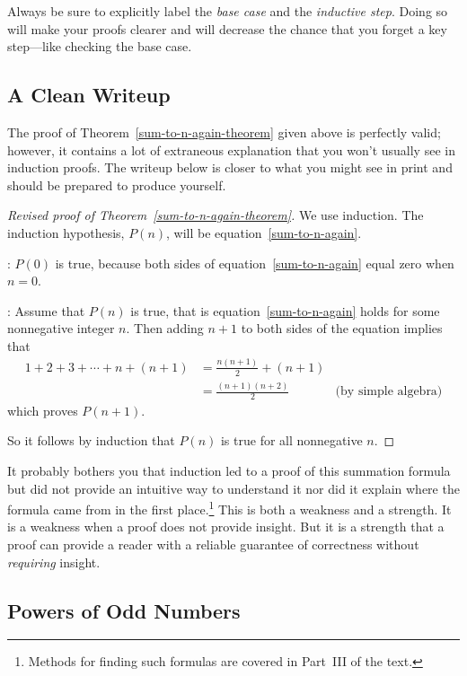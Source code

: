 Always be sure to explicitly label the \emph{base case} and the
\emph{inductive step}.  Doing so will make your proofs clearer and
will decrease the chance that you forget a key step---like checking
the base case.

\subsection{A Clean Writeup}

The proof of Theorem~\ref{sum-to-n-again-theorem} given above is
perfectly valid; however, it contains a lot of extraneous explanation
that you won't usually see in induction proofs.  The writeup below is
closer to what you might see in print and should be prepared to
produce yourself.

\begin{proof}[Revised proof of Theorem~\ref{sum-to-n-again-theorem}]
We use induction.  The induction hypothesis, $P(n)$, will be
equation~\eqref{sum-to-n-again}.

: $P(0)$ is true, because both sides of
equation~\eqref{sum-to-n-again} equal zero when $n=0$.

: Assume that $P(n)$ is true, that is
equation~\eqref{sum-to-n-again} holds for some nonnegative integer
$n$.  Then adding $n+1$ to both sides of the equation implies that
\begin{align*}
1 + 2 + 3 + \cdots + n + (n+1)
    & = \frac{n(n+1)}{2} + (n+1)\\\iffalse  & \text{(by induction hypothesis)} \fi
    & = \frac{(n+1)(n+2)}{2}  & \text{(by simple algebra)}
\end{align*}
which proves $P(n+1)$.

So it follows by induction that $P(n)$ is true for all nonnegative $n$.
\end{proof}

It probably bothers you that induction led to a proof of this
summation formula but did not provide an intuitive way to understand
it nor did it explain where the formula came from in the first
place.\footnote{Methods for finding such formulas are covered in
  Part~III of the text.}  This is both a weakness and a strength.  It
is a weakness when a proof does not provide insight.  But it is a
strength that a proof can provide a reader with a reliable guarantee
of correctness without \emph{requiring} insight.

\iffalse
\subsection{Powers of Odd Numbers}

